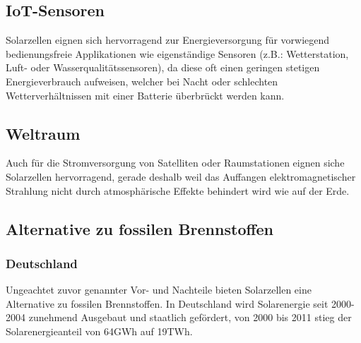 \subsection{IoT-Sensoren}
    Solarzellen eignen sich hervorragend zur Energieversorgung für
    vorwiegend bedienungsfreie Applikationen wie eigenständige Sensoren
    (z.B.: Wetterstation, Luft- oder Wasserqualitätssensoren), da diese
    oft einen geringen stetigen Energieverbrauch aufweisen, welcher
    bei Nacht oder schlechten Wetterverhältnissen mit einer Batterie
    überbrückt werden kann.

\subsection{Weltraum}
    Auch für die Stromversorgung von Satelliten oder Raumstationen eignen
    siche Solarzellen hervorragend, gerade deshalb weil das Auffangen
    elektromagnetischer Strahlung nicht durch atmosphärische Effekte
    behindert wird wie auf der Erde.

\subsection{Alternative zu fossilen Brennstoffen}
    \subsubsection{Deutschland}
        Ungeachtet zuvor genannter Vor- und Nachteile bieten Solarzellen eine
        Alternative zu fossilen Brennstoffen. In Deutschland wird Solarenergie
        seit 2000-2004 zunehmend Ausgebaut und staatlich gefördert, von 2000
        bis 2011 stieg der Solarenergieanteil von 64GWh auf 19TWh.
        \cite{Wiki_PhotovoltaicGermany}

